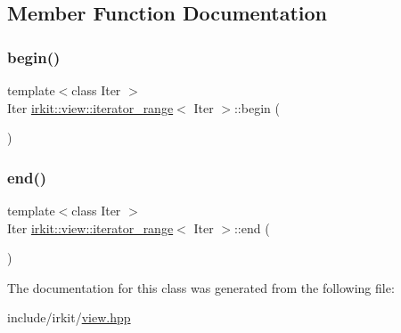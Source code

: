 \subsection{Member Function Documentation}
\mbox{\label{classirkit_1_1view_1_1iterator__range_a510f0a679cad2562b8537fafef71cf5e}} 
\subsubsection{\texorpdfstring{begin()}{begin()}}
{\footnotesize\ttfamily template$<$class Iter $>$ \\
Iter \mbox{\hyperlink{classirkit_1_1view_1_1iterator__range}{irkit\+::view\+::iterator\+\_\+range}}$<$ Iter $>$\+::begin (\begin{DoxyParamCaption}{ }\end{DoxyParamCaption})\hspace{0.3cm}{\ttfamily [inline]}}

\mbox{\label{classirkit_1_1view_1_1iterator__range_ae3f8255c281477d615a56b81c736cdae}} 
\subsubsection{\texorpdfstring{end()}{end()}}
{\footnotesize\ttfamily template$<$class Iter $>$ \\
Iter \mbox{\hyperlink{classirkit_1_1view_1_1iterator__range}{irkit\+::view\+::iterator\+\_\+range}}$<$ Iter $>$\+::end (\begin{DoxyParamCaption}{ }\end{DoxyParamCaption})\hspace{0.3cm}{\ttfamily [inline]}}



The documentation for this class was generated from the following file\+:\begin{DoxyCompactItemize}
\item 
include/irkit/\mbox{\hyperlink{view_8hpp}{view.\+hpp}}\end{DoxyCompactItemize}

